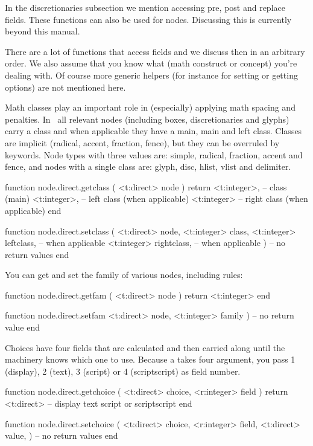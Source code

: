 In the discretionaries subsection we mention accessing pre, post and replace
fields. These functions can also be used for  nodes. Discussing
this is currently beyond this manual.

There are a lot of functions that access fields and we discuss then in an
arbitrary order. We also assume that you know what (math construct or concept)
you're dealing with. Of course more generic helpers (for instance for setting or
getting options) are not mentioned here.

Math classes play an important role in (especially) applying math spacing and
penalties. In \LUAMETATEX\ all relevant nodes (including boxes, discretionaries
and glyphs) carry a class and when applicable they have a main, main and left
class. Classes are implicit (radical, accent, fraction, fence), but they can be
overruled by keywords. Node types with three values are: simple, radical,
fraction, accent and fence, and nodes with a single class are: glyph, disc,
hlist, vlist and delimiter.

\starttyping[option=LUA]
function node.direct.getclass ( <t:direct> node )
    return
        <t:integer>, -- class       (main)
        <t:integer>, -- left class  (when applicable)
        <t:integer>  -- right class (when applicable)
end

function node.direct.setclass (
    <t:direct>  node,
    <t:integer> class,
    <t:integer> leftclass,  -- when applicable
    <t:integer> rightclass, -- when applicable
)
    -- no return values
end
\stoptyping

You can get and set the family of various nodes, including rules:

\starttyping[option=LUA]
function node.direct.getfam ( <t:direct> node )
    return <t:integer>
end

function node.direct.setfam
    <t:direct>  node,
    <t:integer> family
)
     -- no return value
end
\stoptyping

Choices have four fields that are calculated and then carried along until the
machinery knows which one to use. Because a  takes four
argument, you pass 1 (display), 2 (text), 3 (script) or 4 (scriptscript) as field
number.

\starttyping[option=LUA]
function node.direct.getchoice (
    <t:direct>  choice,
    <r:integer> field
)
    return <t:direct> -- display text script or scriptscript
end

function node.direct.setchoice (
    <t:direct>  choice,
    <r:integer> field,
    <t:direct>  value,
)
    -- no return values
end
\stoptyping

